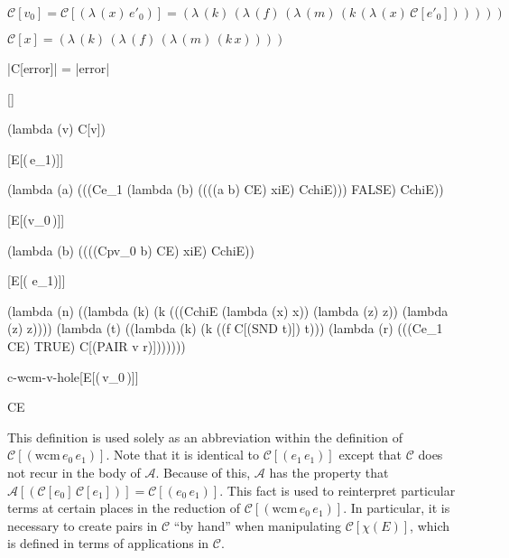 \documentclass[ms,electronic,twosidetoc,letterpaper,chaptercenter,parttop]{byumsphd}
\newcommand{\C}[1]{\mathcal{C}[#1]}
\newcommand{\abs}[2]{(\lambda\,(#1)\,#2)}
\newcommand{\app}[2]{(#1\,#2)}
\newcommand{\wcm}[2]{(\mathrm{wcm}\,#1\,#2)}
\newcommand{\hole}{\bullet}
\begin{document}
\begin{defn}
$\C{v_0}=\C{\abs{x}{e'_0}}=\abs{k}{\abs{f}{\abs{m}{\app{k}{\abs{x}{\C{e'_0}}}}}}$
\end{defn}

\begin{defn}
$\C{x}=\abs{k}{\abs{f}{\abs{m}{\app{k}{x}}}}$
\end{defn}

\begin{defn}
\scheme|C[error]| = \scheme|error|
\end{defn}

\begin{schemedefn}{\C{\hole}}
\begin{schemedisplay}
(lambda (v) C[v])
\end{schemedisplay}
\end{schemedefn}

\begin{schemedefn}{\C{E[\app{\hole}{e_1}]}}
\begin{schemedisplay}
(lambda (a)
  (((Ce_1
     (lambda (b)
       ((((a b) CE) xiE) CchiE)))
    FALSE)
   CchiE))
\end{schemedisplay}
\end{schemedefn}

\begin{schemedefn}{\C{E[\app{v_0}{\hole}]}}
\begin{schemedisplay}
(lambda (b) ((((Cpv_0 b) CE) xiE) CchiE))
\end{schemedisplay}
\end{schemedefn}

\begin{schemedefn}{\C{E[\wcm{\hole}{e_1}]}}
\begin{schemedisplay}
(lambda (n) ((lambda (k) 
               (k (((CchiE (lambda (x) x)) (lambda (z) z)) (lambda (z) z))))
             (lambda (t) 
               ((lambda (k) (k ((f C[(SND t)]) t)))
                  (lambda (r) 
                    (((Ce_1 CE) TRUE) C[(PAIR v r)]))))))
\end{schemedisplay}
\end{schemedefn}

\begin{namedschemedefn}{c-wcm-v-hole}{\C{E[\wcm{v_0}{\hole}]}}
\begin{schemedisplay}
CE
\end{schemedisplay}
\end{namedschemedefn}

This definition is used solely as an abbreviation within the definition of
$\C{\wcm{e_0}{e_1}}$. Note that it is identical to $\C{\app{e_1}{e_1}}$ except that
$\mathcal{C}$ does not recur in the body of $\mathcal{A}$. Because of this, $\mathcal{A}$
has the property that $\mathcal{A}[\app{\C{e_0}}{\C{e_1}}]=\C{\app{e_0}{e_1}}$. This fact
is used to reinterpret particular terms at certain places in the reduction of
$\C{\wcm{e_0}{e_1}}$. In particular, it is necessary to create pairs in $\mathcal{C}$ ``by
hand'' when manipulating $\C{\chi(E)}$, which is defined in terms of applications in
$\mathcal{C}$.
\end{document}
